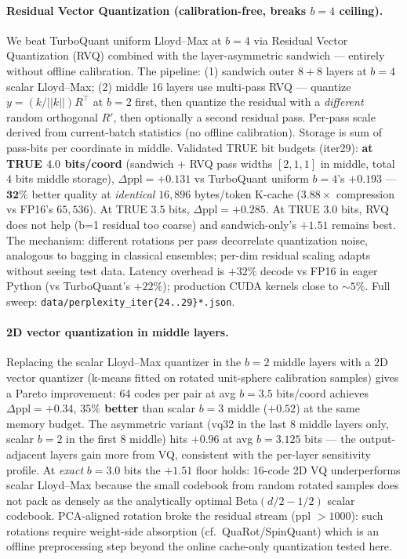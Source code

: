 \documentclass[11pt]{article}
\theoremstyle{definition}
\begin{document}
\paragraph{Residual Vector Quantization (calibration-free, breaks $b{=}4$ ceiling).}
We beat TurboQuant uniform Lloyd--Max at $b{=}4$ via Residual Vector
Quantization (RVQ) combined with the layer-asymmetric sandwich --- entirely
without offline calibration. The pipeline: (1) sandwich outer $8{+}8$ layers
at $b{=}4$ scalar Lloyd--Max; (2) middle 16 layers use multi-pass RVQ ---
quantize $y = (k/||k||) R^\top$ at $b{=}2$ first, then quantize the residual
with a \emph{different} random orthogonal $R'$, then optionally a second
residual pass. Per-pass scale derived from current-batch statistics (no
offline calibration). Storage is sum of pass-bits per coordinate in middle.
Validated TRUE bit budgets (iter29):
\textbf{at TRUE $4.0$ bits/coord} (sandwich + RVQ pass widths $[2,1,1]$ in middle, total $4$ bits middle storage),
$\Delta\text{ppl} = \boldsymbol{+0.131}$ vs TurboQuant uniform $b{=}4$'s $+0.193$
--- $\boldsymbol{32\%}$ better quality at \emph{identical} $16{,}896$ bytes/token K-cache ($3.88\times$ compression vs FP16's $65{,}536$). At TRUE $3.5$ bits,
$\Delta\text{ppl} = +0.285$. At TRUE $3.0$ bits, RVQ does not help (b=1 residual
too coarse) and sandwich-only's $+1.51$ remains best.
The mechanism: different rotations per pass decorrelate quantization noise,
analogous to bagging in classical ensembles; per-dim residual scaling adapts
without seeing test data. Latency overhead is $+32\%$ decode vs FP16 in eager
Python (vs TurboQuant's $+22\%$); production CUDA kernels close to $\sim 5\%$.
Full sweep: \texttt{data/perplexity\_iter\{24..29\}*.json}.

\paragraph{2D vector quantization in middle layers.}
Replacing the scalar Lloyd--Max quantizer in the $b{=}2$ middle layers with a
2D vector quantizer (k-means fitted on rotated unit-sphere calibration
samples) gives a Pareto improvement: 64 codes per pair at avg
$b{=}3.5$ bits/coord achieves $\Delta\text{ppl} = \boldsymbol{+0.34}$,
\textbf{$35\%$ better} than scalar $b{=}3$ middle ($+0.52$) at the same
memory budget. The asymmetric variant
(vq32 in the last 8 middle layers only, scalar $b{=}2$ in the first 8 middle)
hits $+0.96$ at avg $b{=}3.125$ bits --- the output-adjacent layers gain
more from VQ, consistent with the per-layer sensitivity profile.
At \emph{exact} $b{=}3.0$ bits the $+1.51$ floor holds: 16-code 2D VQ
underperforms scalar Lloyd--Max because the small codebook from random
rotated samples does not pack as densely as the analytically optimal
Beta$(d/2-1/2)$ scalar codebook. PCA-aligned rotation broke the residual
stream (ppl $>1000$): such rotations require weight-side absorption (cf.\
QuaRot/SpinQuant) which is an offline preprocessing step beyond the
online cache-only quantization tested here.
\end{document}
